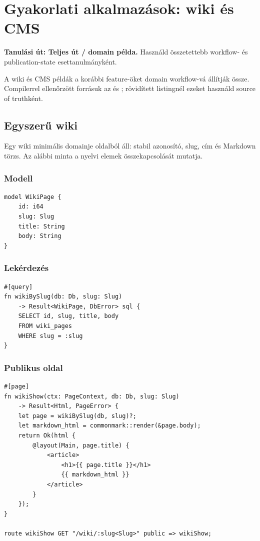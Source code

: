 \chapter{Gyakorlati alkalmazások: wiki és CMS}

\noindent\textbf{Tanulási út: Teljes út / domain példa.} Használd összetettebb workflow- és publication-state esettanulmányként.\par\medskip

A wiki és CMS példák a korábbi feature-öket domain workflow-vá állítják össze. Compilerrel ellenőrzött forrásuk az  és ; rövidített listingnél ezeket használd source of truthként.

\section{Egyszerű wiki}

Egy wiki minimális domainje oldalból áll: stabil azonosító, slug, cím és Markdown törzs. Az alábbi minta a nyelvi elemek összekapcsolását mutatja.

\subsection*{Modell}

\begin{lstlisting}[language=Velran]
model WikiPage {
    id: i64
    slug: Slug
    title: String
    body: String
}
\end{lstlisting}

\subsection*{Lekérdezés}

\begin{lstlisting}[language=Velran]
#[query]
fn wikiBySlug(db: Db, slug: Slug)
    -> Result<WikiPage, DbError> sql {
    SELECT id, slug, title, body
    FROM wiki_pages
    WHERE slug = :slug
}
\end{lstlisting}

\subsection*{Publikus oldal}

\begin{lstlisting}[language=Velran]
#[page]
fn wikiShow(ctx: PageContext, db: Db, slug: Slug)
    -> Result<Html, PageError> {
    let page = wikiBySlug(db, slug)?;
    let markdown_html = commonmark::render(&page.body);
    return Ok(html {
        @layout(Main, page.title) {
            <article>
                <h1>{{ page.title }}</h1>
                {{ markdown_html }}
            </article>
        }
    });
}

route wikiShow GET "/wiki/:slug<Slug>" public => wikiShow;
\end{lstlisting}

